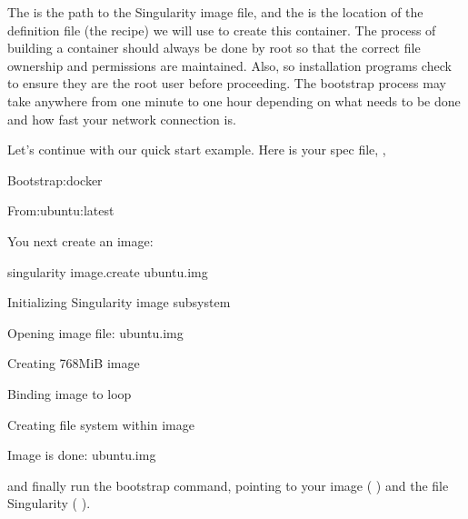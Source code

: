 \documentclass[letterpaper,10pt,english]{sphinxmanual}
\begin{document}
The  is the path to the Singularity image file, and the  is the location
of the definition file (the recipe) we will use to create this
container. The process of building a container should always be done
by root so that the correct file ownership and permissions are
maintained. Also, so installation programs check to ensure they are
the root user before proceeding. The bootstrap process may take
anywhere from one minute to one hour depending on what needs to be
done and how fast your network connection is.

Let’s continue with our quick start example. Here is your spec file,  ,

%
\begin{sphinxVerbatim}[commandchars=\\\{\}]
Bootstrap:docker

From:ubuntu:latest
\end{sphinxVerbatim}

You next create an image:

%
\begin{sphinxVerbatim}[commandchars=\\\{\}]
\PYGZdl{} singularity image.create ubuntu.img

Initializing Singularity image subsystem

Opening image file: ubuntu.img

Creating 768MiB image

Binding image to loop

Creating file system within image

Image is done: ubuntu.img
\end{sphinxVerbatim}

and finally run the bootstrap command, pointing to your image (  ) and
the file Singularity (  ).
\end{document}
